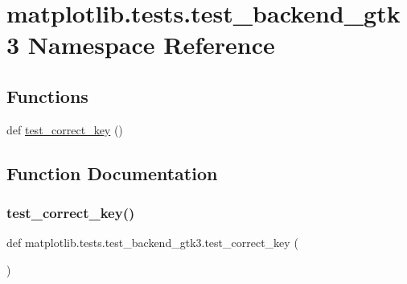 \hypertarget{namespacematplotlib_1_1tests_1_1test__backend__gtk3}{}\section{matplotlib.\+tests.\+test\+\_\+backend\+\_\+gtk3 Namespace Reference}
\label{namespacematplotlib_1_1tests_1_1test__backend__gtk3}
\subsection*{Functions}
\begin{DoxyCompactItemize}
\item 
def \hyperlink{namespacematplotlib_1_1tests_1_1test__backend__gtk3_af26239602b20bb58ad7e7d296c204ebe}{test\+\_\+correct\+\_\+key} ()
\end{DoxyCompactItemize}


\subsection{Function Documentation}
\mbox{\label{namespacematplotlib_1_1tests_1_1test__backend__gtk3_af26239602b20bb58ad7e7d296c204ebe}} 
\subsubsection{\texorpdfstring{test\+\_\+correct\+\_\+key()}{test\_correct\_key()}}
{\footnotesize\ttfamily def matplotlib.\+tests.\+test\+\_\+backend\+\_\+gtk3.\+test\+\_\+correct\+\_\+key (\begin{DoxyParamCaption}{ }\end{DoxyParamCaption})}

